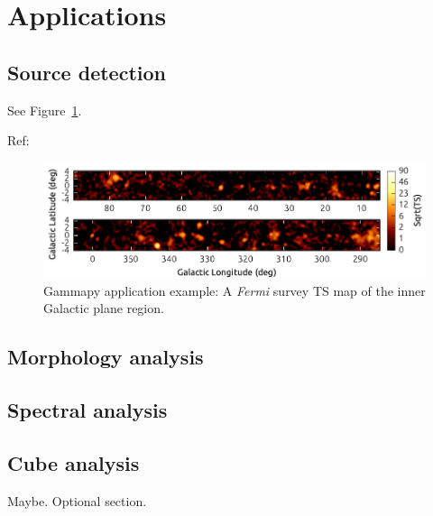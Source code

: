 \section{Applications}
\label{sec:apps}

\subsection{Source detection}
\label{apps:detect}

See Figure~\ref{fig:fermi-ts-image}.

Ref: \citep{Stewart2009}

\begin{figure}[t]
\centering
\includegraphics[width=1.\textwidth]{figures/gammapy-fermi-ts-image}
\caption{
Gammapy application example: A \textit{Fermi} survey TS map of the inner
Galactic plane region.
}
\label{fig:fermi-ts-image}
\end{figure}

\subsection{Morphology analysis}
\label{apps:morph}

\subsection{Spectral analysis}
\label{apps:spec}

\subsection{Cube analysis}
\label{apps:cube}

Maybe. Optional section.

